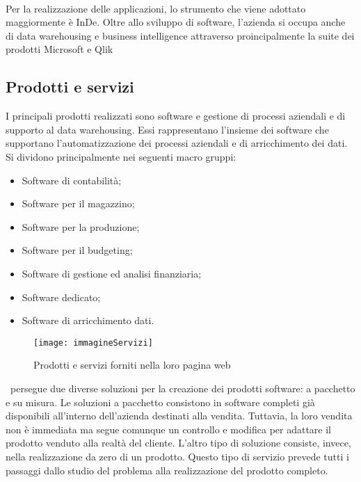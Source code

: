\paragraph*{}Per la realizzazione delle applicazioni, lo strumento che viene adottato maggiormente è InDe. Oltre allo sviluppo di software, l’azienda si occupa anche di data warehousing e business intelligence attraverso proincipalmente la suite dei prodotti Microsoft e Qlik 



\subsection{Prodotti e servizi}
\label{cap1:Prodotti e servizi}
I principali prodotti realizzati sono software e gestione di processi aziendali e di supporto al data warehousing. Essi rappresentano l'insieme dei software che supportano l'automatizzazione dei processi aziendali e di arricchimento dei dati. Si dividono principalmente nei seguenti macro gruppi:
\begin{itemize}
	\item Software di contabilità;
	\item Software per il magazzino;
	\item Software per la produzione;
	\item Software per il budgeting;
	\item Software di gestione ed analisi finanziaria;
	\item Software dedicato;
	\item Software di arricchimento dati.
\end{itemize}

\begin{figure}[!h] 
	\centering 
	\texttt{[image: immagineServizi]} 
	\caption{Prodotti e servizi forniti nella loro pagina web}
\end{figure}

\azienda\ persegue due diverse soluzioni per la creazione dei prodotti software: a pacchetto e su misura. Le soluzioni a pacchetto consistono in software completi già disponibili all'interno dell'azienda destinati alla vendita. Tuttavia, la loro vendita non è immediata ma segue comunque un controllo e modifica per adattare il prodotto venduto alla realtà del cliente. L'altro tipo di soluzione consiste, invece, nella realizzazione da zero di un prodotto. Questo tipo di servizio prevede tutti i passaggi dallo studio del problema alla realizzazione del prodotto completo.

